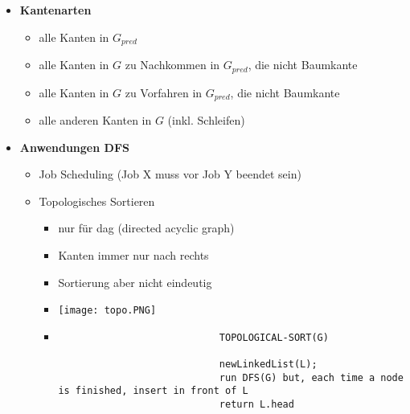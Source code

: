 \begin{itemize}
        \item \textbf{Kantenarten}
            \begin{itemize}
                \item {} alle Kanten in $G_{pred}$
                \item {} alle Kanten in $G$ zu Nachkommen in $G_{pred}$, die nicht Baumkante
                \item {} alle Kanten in $G$ zu Vorfahren in $G_{pred}$, die nicht Baumkante
                \item {} alle anderen Kanten in $G$ (inkl. Schleifen)
            \end{itemize}

        \item \textbf{Anwendungen DFS}
            \begin{itemize}
                \item Job Scheduling (Job X muss vor Job Y beendet sein)
                \item Topologisches Sortieren
                    \begin{itemize}
                        \item nur für dag (directed acyclic graph)
                        \item Kanten immer nur nach rechts
                        \item Sortierung aber nicht eindeutig
                        \item[] \texttt{[image: topo.PNG]}
                        \item[]
                            \begin{verbatim}
                            TOPOLOGICAL-SORT(G)

                            newLinkedList(L);
                            run DFS(G) but, each time a node is finished, insert in front of L
                            return L.head
                            \end{verbatim} 
                    \end{itemize}
            \end{itemize}
        
\pagebreak


\end{itemize}
